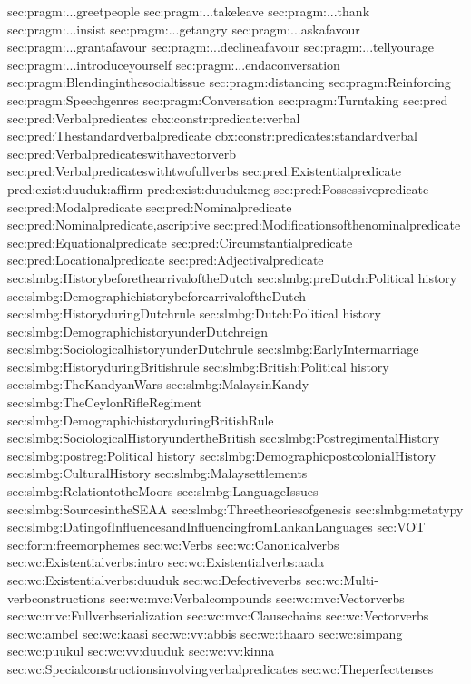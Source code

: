 {sec:pragm:...greetpeople}
{sec:pragm:...takeleave}
{sec:pragm:...thank}
{sec:pragm:...insist}
{sec:pragm:...getangry}
{sec:pragm:...askafavour}
{sec:pragm:...grantafavour}
{sec:pragm:...declineafavour}
{sec:pragm:...tellyourage}
{sec:pragm:...introduceyourself}
{sec:pragm:...endaconversation}
{sec:pragm:Blendinginthesocialtissue}
{sec:pragm:distancing}
{sec:pragm:Reinforcing}
{sec:pragm:Speechgenres}
{sec:pragm:Conversation}
{sec:pragm:Turntaking}
{sec:pred}
{sec:pred:Verbalpredicates}
{cbx:constr:predicate:verbal}
{sec:pred:Thestandardverbalpredicate}
{cbx:constr:predicates:standardverbal}
{sec:pred:Verbalpredicateswithavectorverb}
{sec:pred:Verbalpredicateswithtwofullverbs}
{sec:pred:Existentialpredicate}
{pred:exist:duuduk:affirm}
{pred:exist:duuduk:neg}
{sec:pred:Possessivepredicate}
{sec:pred:Modalpredicate}
{sec:pred:Nominalpredicate}
{sec:pred:Nominalpredicate,ascriptive}
{sec:pred:Modificationsofthenominalpredicate}
{sec:pred:Equationalpredicate}
{sec:pred:Circumstantialpredicate}
{sec:pred:Locationalpredicate}
{sec:pred:Adjectivalpredicate}
{sec:slmbg:HistorybeforethearrivaloftheDutch}
{sec:slmbg:preDutch:Political history}
{sec:slmbg:DemographichistorybeforearrivaloftheDutch}
{sec:slmbg:HistoryduringDutchrule}
{sec:slmbg:Dutch:Political history}
{sec:slmbg:DemographichistoryunderDutchreign}
{sec:slmbg:SociologicalhistoryunderDutchrule}
{sec:slmbg:EarlyIntermarriage}
{sec:slmbg:HistoryduringBritishrule}
{sec:slmbg:British:Political history}
{sec:slmbg:TheKandyanWars}
{sec:slmbg:MalaysinKandy}
{sec:slmbg:TheCeylonRifleRegiment}
{sec:slmbg:DemographichistoryduringBritishRule}
{sec:slmbg:SociologicalHistoryundertheBritish}
{sec:slmbg:PostregimentalHistory}
{sec:slmbg:postreg:Political history}
{sec:slmbg:DemographicpostcolonialHistory}
{sec:slmbg:CulturalHistory}
{sec:slmbg:Malaysettlements}
{sec:slmbg:RelationtotheMoors}
{sec:slmbg:LanguageIssues}
{sec:slmbg:SourcesintheSEAA}
{sec:slmbg:Threetheoriesofgenesis}
{sec:slmbg:metatypy}
{sec:slmbg:DatingofInfluencesandInfluencingfromLankanLanguages}
{sec:VOT}
{sec:form:freemorphemes}
{sec:wc:Verbs}
{sec:wc:Canonicalverbs}
{sec:wc:Existentialverbs:intro}
{sec:wc:Existentialverbs:aada}
{sec:wc:Existentialverbs:duuduk}
{sec:wc:Defectiveverbs}
{sec:wc:Multi-verbconstructions}
{sec:wc:mvc:Verbalcompounds}
{sec:wc:mvc:Vectorverbs}
{sec:wc:mvc:Fullverbserialization}
{sec:wc:mvc:Clausechains}
{sec:wc:Vectorverbs}
{sec:wc:ambel}
{sec:wc:kaasi}
{sec:wc:vv:abbis}
{sec:wc:thaaro}
{sec:wc:simpang}
{sec:wc:puukul}
{sec:wc:vv:duuduk}
{sec:wc:vv:kinna}
{sec:wc:Specialconstructionsinvolvingverbalpredicates}
{sec:wc:Theperfecttenses}
